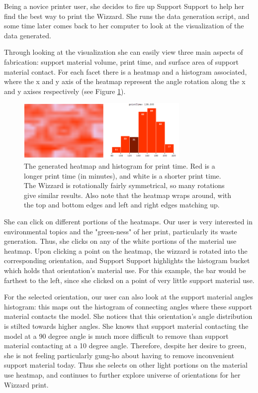 \documentclass{sigchi}
\begin{document}
Being a novice printer user, she decides to fire up Support Support to help her find the best way to print the Wizzard.  She runs the data generation script, and some time later comes back to her computer to look at the visualization of the data generated.

Through looking at the visualization she can easily view three main aspects of fabrication: support material volume, print time, and surface area of support material contact. For each facet there is a heatmap and a histogram associated, where the x and y axis of the heatmap represent the angle rotation along the x and y axises respectively (see Figure \ref{fig:heatmap}).

\begin{figure}
\centering
\includegraphics[width=3.25in]{images/heatmap.png}
\caption{The generated heatmap and histogram for print time.  Red is a longer print time (in minutes), and white is a shorter print time.  The Wizzard is rotationally fairly symmetrical, so many rotations give similar results.  Also note that the heatmap wraps around, with the top and bottom edges and left and right edges matching up.}
\label{fig:heatmap}
\end{figure}

She can click on different portions of the heatmaps.  Our user is very interested in environmental topics and the "green-ness" of her print, particularly its waste generation. Thus, she clicks on any of the white portions of the material use heatmap. Upon clicking a point on the heatmap, the wizzard is rotated into the corresponding orientation, and Support Support highlights the histogram bucket which holds that orientation's material use. For this example, the bar would be farthest to the left, since she clicked on a point of very little support material use.

For the selected orientation, our user can also look at the support material angles histogram: this maps out the histogram of connecting angles where these support material contacts the model. She notices that this orientation's angle distribution is stilted towards higher angles.  She knows that support material contacting the model at a 90 degree angle is much more difficult to remove than support material contacting at a 10 degree angle. Therefore, despite her desire to green, she is not feeling particularly gung-ho about having to remove inconvenient support material today. Thus she selects on other light portions on the material use heatmap, and continues to further explore universe of orientations for her Wizzard print.
\end{document}
